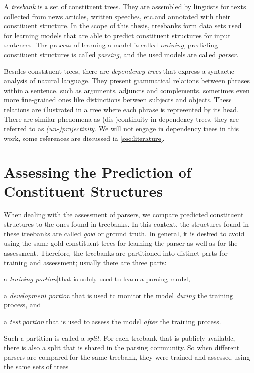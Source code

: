 \documentclass[../document.tex]{subfiles}
\begin{document}
    A \emph{treebank} is a set of constituent trees.
    They are assembled by linguists for texts collected from news articles, written speeches, etc.\@ and annotated with their constituent structure.
    In the scope of this thesis, treebanks form data sets used for learning models that are able to predict constituent structures for input sentences.
    The process of learning a model is called \emph{training}, predicting constituent structures is called \emph{parsing}, and the used models are called \emph{parser}.

    Besides constituent trees, there are \emph{dependency trees} that express a syntactic analysis of natural language.
    They present grammatical relations between phrases within a sentence, such as arguments, adjuncts and complements, sometimes even more fine-grained ones like distinctions between subjects and objects.
    These relations are illustrated in a tree where each phrase is represented by its head.
    There are similar phenomena as (dis-)continuity in dependency trees, they are referred to as \emph{(un-)projectivity}.
    We will not engage in dependency trees in this work, some references are discussed in \cref{sec:literature}.

    \section{Assessing the Prediction of Constituent Structures}
    When dealing with the assessment of parsers, we compare predicted constituent structures to the ones found in treebanks.
    In this context, the structures found in these treebanks are called \emph{gold} or ground truth.
    In general, it is desired to avoid using the same gold constituent trees for learning the parser as well as for the assessment.
    Therefore, the treebanks are partitioned into distinct parts for training and assessment; usually there are three parts:
    \begin{inparaenum}[(i)]
        \item a \emph{training portion}]that is solely used to learn a parsing model,
        \item a \emph{development portion} that is used to monitor the model \emph{during} the training process, and
        \item a \emph{test portion} that is used to assess the model \emph{after} the training process.
    \end{inparaenum}
    Such a partition is called a \emph{split}.
    For each treebank that is publicly available, there is also a split that is shared in the parsing community.
    So when different parsers are compared for the same treebank, they were trained and assessed using the same sets of trees.
\end{document}
